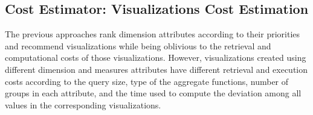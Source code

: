 \subsection{Cost Estimator: Visualizations Cost Estimation}
\label{sec:cost_est}
%
\begin{algorithm}[t]
\label{alg:viewsest}
\caption{$ViewsEstimate$}
\;
\end{algorithm}
%
The previous approaches rank dimension attributes according to their priorities 
and recommend visualizations while being oblivious to the retrieval and computational costs of those visualizations.
However, visualizations created using different dimension and measures attributes have different retrieval and execution costs 
according to the query size, type of the aggregate functions, number of groups in each attribute, and 
the time used to compute the deviation among all values in the corresponding visualizations.
% 
%

